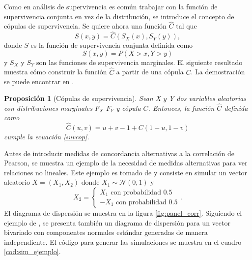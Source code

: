 \documentclass[11pt,a4paper]{article}
\newtheorem{proposition}{Proposición}[subsection]
\begin{document}
Como en análisis de supervivencia es común trabajar con la función de supervivencia conjunta en vez de la distribución, se introduce el concepto de cópulas de supervivencia. Se quiere ahora una función $\widehat{C}$ tal que
\begin{equation} \label{suvcop}
S(x, y) = \widehat{C}(S_X(x), S_Y(y)),
\end{equation}
donde $S$ es la función de supervivencia conjunta definida como $$S(x, y ) = P\left( X>x, Y>y\right)$$ y $S_X$ y $S_Y$ son las funciones de supervivencia marginales. El siguiente resultado muestra cómo construir la función $\widehat{C}$ a partir de una cópula $C$. La demostración se puede encontrar en \citet{nelsen}.

\begin{proposition}[Cópulas de supervivencia]
\label{def_cop_surv}
Sean X y Y dos variables aleatorias con distribuciones marginales $F_X$ $F_Y$ y cópula $C$. Entonces, la función $\widehat{C}$ definida como $$\widehat{C}(u, v) = u + v - 1 + C(1-u, 1-v)$$ cumple la ecuación \eqref{suvcop}.
\end{proposition}

Antes de introducir medidas de concordancia alternativas a la correlación de Pearson, se muestra un ejemplo de la necesidad de medidas alternativas para ver relaciones no lineales. Este ejemplo es tomado de \citet{copula_modeling} y consiste en simular un vector aleatorio $X = (X_1, X_2)$ donde $X_1 \sim \mathcal{N}(0, 1)$ y $$X_2 = \begin{cases}
X_1  \text{ con probabilidad } 0.5\\
-X_1 \text{ con probabilidad }  0.5
\end{cases}.$$ El diagrama de dispersión se muestra en la figura \ref{fig:panel_corr}. Siguiendo el ejemplo de \citet{copula_modeling}, se presenta también un diagrama de dispersión para un vector bivariado con componentes normales estándar generadas de manera independiente. El código para generar las simulaciones se muestra en el cuadro \ref{cod:sim_ejemplo}.
\end{document}
